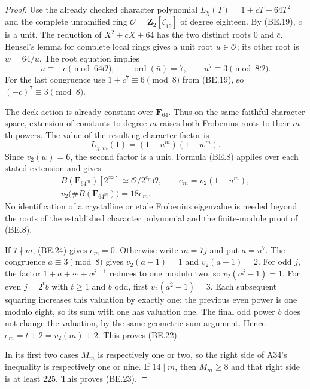 \documentclass[11pt,a4paper]{article}
\begin{document}
\begin{proof}
Use the already checked character polynomial
$L_\chi(T)=1+cT+64T^2$ and the complete unramified ring
$\mathcal O=\mathbf Z_2[\zeta_{19}]$ of degree eighteen.
By (BE.19), $c$ is a unit.  The reduction of
$X^2+cX+64$ has the two distinct roots $0$ and $\bar c$.
Hensel's lemma for complete local rings
\cite[Lemma~10.153.9, Tag~\texttt{04GM}]{Stacks04GM}
gives a unit root $u\in\mathcal O$; its other root is
$w=64/u$.  The root equation implies
\[
 u\equiv-c\pmod{64\mathcal O},\qquad
 \operatorname{ord}(\bar u)=7,
 \qquad u^7\equiv3\pmod{8\mathcal O}.                          \tag{BE.24}
\]
For the last congruence use $1+c^7\equiv6\pmod8$ from
(BE.19), so $(-c)^7\equiv3\pmod8$.

The deck action is already constant over $\mathbf F_{64}$.
Thus on the same faithful character space, extension of
constants to degree $m$ raises both Frobenius roots to their
$m$th powers.  The value of the resulting character factor is
\[
           L_{\chi,m}(1)=(1-u^m)(1-w^m).
                                                               \tag{BE.25}
\]
Since $v_2(w)=6$, the second factor is a unit.  Formula
(BE.8) applies over each stated extension and gives
\[
 \begin{gathered}
 B(\mathbf F_{64^m})[2^\infty]\simeq
      \mathcal O/2^{e_m}\mathcal O,
 \qquad e_m=v_2(1-u^m),\\
 v_2\bigl(\#B(\mathbf F_{64^m})\bigr)=18e_m.
 \end{gathered}
                                                               \tag{BE.26}
\]
No identification of a crystalline or etale Frobenius
eigenvalue is needed beyond the roots of the established
character polynomial and the finite-module proof of (BE.8).

If $7\nmid m$, (BE.24) gives $e_m=0$.
Otherwise write $m=7j$ and put $a=u^7$.
The congruence $a\equiv3\pmod8$ gives
$v_2(a-1)=1$ and $v_2(a+1)=2$.
For odd $j$, the factor $1+a+\cdots+a^{j-1}$ reduces to
one modulo two, so $v_2(a^j-1)=1$.
For even $j=2^t b$ with $t\geq1$ and $b$ odd, first
$v_2(a^2-1)=3$.  Each subsequent squaring increases this
valuation by exactly one: the previous even power is one
modulo eight, so its sum with one has valuation one.
The final odd power $b$ does not change the valuation,
by the same geometric-sum argument.  Hence
$e_m=t+2=v_2(m)+2$.  This proves (BE.22).

In its first two cases $M_m$ is respectively one or two,
so the right side of A34's inequality is respectively one
or nine.  If $14\mid m$, then $M_m\geq8$ and that right
side is at least $225$.  This proves (BE.23).
\end{proof}
\end{document}
